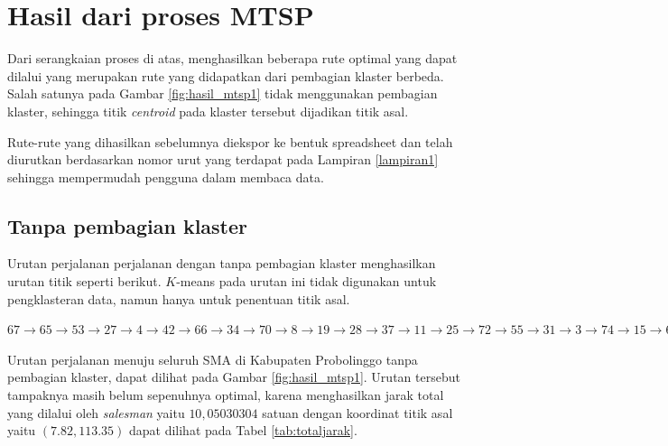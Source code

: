 \section{Hasil dari proses MTSP}

Dari serangkaian proses di atas, menghasilkan beberapa rute optimal yang dapat dilalui yang merupakan rute yang didapatkan dari pembagian klaster berbeda. Salah satunya pada Gambar \ref{fig:hasil_mtsp1} tidak menggunakan pembagian klaster, sehingga titik \textit{centroid} pada klaster tersebut dijadikan titik asal.

Rute-rute yang dihasilkan sebelumnya diekspor ke bentuk spreadsheet dan telah diurutkan berdasarkan nomor urut yang terdapat pada Lampiran \ref{lampiran1} sehingga mempermudah pengguna dalam membaca data.

\subsection{Tanpa pembagian klaster}

Urutan perjalanan perjalanan dengan tanpa pembagian klaster menghasilkan urutan titik seperti berikut. $K$-means pada urutan ini tidak digunakan untuk pengklasteran data, namun hanya untuk penentuan titik asal.

$67\rightarrow65\rightarrow53\rightarrow27\rightarrow4\rightarrow42\rightarrow66\rightarrow34\rightarrow70\rightarrow8\rightarrow19\rightarrow28\rightarrow37\rightarrow11\rightarrow25\rightarrow72\rightarrow55\rightarrow31\rightarrow3\rightarrow74\rightarrow15\rightarrow68\rightarrow20\rightarrow44\rightarrow40\rightarrow16\rightarrow30\rightarrow23\rightarrow24\rightarrow63\rightarrow13\rightarrow29\rightarrow50\rightarrow7\rightarrow54\rightarrow2\rightarrow10\rightarrow52\rightarrow64\rightarrow21\rightarrow62\rightarrow58\rightarrow26\rightarrow1\rightarrow69\rightarrow14\rightarrow45\rightarrow61\rightarrow38\rightarrow59\rightarrow17\rightarrow71\rightarrow18\rightarrow32\rightarrow57\rightarrow73\rightarrow75\rightarrow41\rightarrow39\rightarrow49\rightarrow51\rightarrow6\rightarrow60\rightarrow22\rightarrow33\rightarrow48\rightarrow5\rightarrow35\rightarrow46\rightarrow56\rightarrow36\rightarrow47\rightarrow9\rightarrow12\rightarrow43$

Urutan perjalanan menuju seluruh SMA di Kabupaten Probolinggo tanpa pembagian klaster, dapat dilihat pada Gambar \ref{fig:hasil_mtsp1}. Urutan tersebut tampaknya masih belum sepenuhnya optimal, karena menghasilkan jarak total yang dilalui oleh \textit{salesman} yaitu $10,05030304$ satuan dengan koordinat titik asal yaitu $(7.82, 113.35)$ dapat dilihat pada Tabel \ref{tab:totaljarak}.

